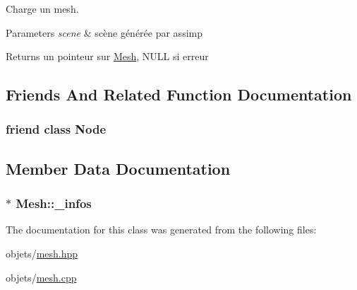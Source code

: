Charge un mesh. 


\begin{DoxyParams}{Parameters}
{\em scene} & scène générée par assimp\\
\hline
\end{DoxyParams}
\begin{DoxyReturn}{Returns}
un pointeur sur \hyperlink{class_mesh}{Mesh}, N\+U\+L\+L si erreur 
\end{DoxyReturn}


\subsection{Friends And Related Function Documentation}
\hypertarget{class_mesh_a6db9d28bd448a131448276ee03de1e6d}{
\subsubsection[{Node}]{\setlength{\rightskip}{0pt plus 5cm}friend class {\bf Node}\hspace{0.3cm}{\ttfamily [friend]}}}\label{class_mesh_a6db9d28bd448a131448276ee03de1e6d}


\subsection{Member Data Documentation}
\hypertarget{class_mesh_a608911b8dbff58ff769c708b8b7f2618}{
\subsubsection[{\+\_\+infos}]{$\ast$ Mesh\+::\+\_\+infos\hspace{0.3cm}{\ttfamily [private]}}}\label{class_mesh_a608911b8dbff58ff769c708b8b7f2618}


The documentation for this class was generated from the following files\+:\begin{DoxyCompactItemize}
\item 
objets/\hyperlink{mesh_8hpp}{mesh.\+hpp}\item 
objets/\hyperlink{mesh_8cpp}{mesh.\+cpp}\end{DoxyCompactItemize}
